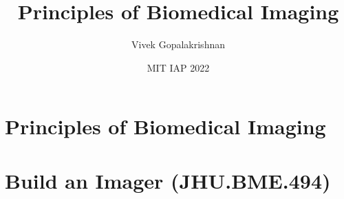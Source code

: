 \documentclass[letter,twoside,openany]{tufte-book}
\title[(HST.164) Principles of Biomedical Imaging]{Principles of Biomedical Imaging}
\author{Vivek Gopalakrishnan}
\date{MIT IAP 2022}
\begin{document}
\maketitle
\tableofcontents
\newpage



\part{Principles of Biomedical Imaging}




\part{Build an Imager (JHU.BME.494)}



\end{document}
